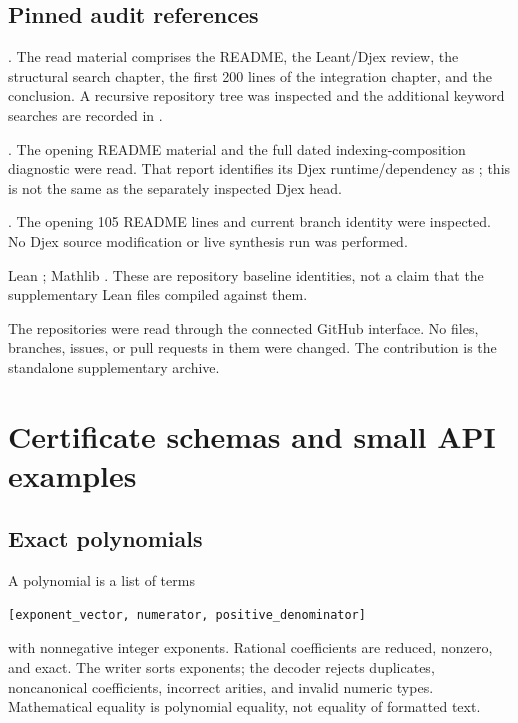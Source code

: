 \subsection{Pinned audit references}
\begin{description}[style=nextline]
\item[Forge]
.
The read material comprises the README, the Leant/Djex review, the structural
search chapter, the first 200 lines of the integration chapter, and the
conclusion. A recursive repository tree was inspected and the additional
keyword searches are recorded in .
\item[Leant]
.
The opening README material and the full dated indexing-composition diagnostic
were read. That report identifies its Djex runtime/dependency as
; this is not the same as the separately inspected Djex head.
\item[Djex]
.
The opening 105 README lines and current branch identity were inspected. No
Djex source modification or live synthesis run was performed.
\item[Forge's reported target toolchain]
Lean ; Mathlib
.
These are repository baseline identities, not a claim that the supplementary
Lean files compiled against them.
\end{description}

The repositories were read through the connected GitHub interface. No files,
branches, issues, or pull requests in them were changed. The contribution is the
standalone supplementary archive.

\section{Certificate schemas and small API examples}
\label{app:schemas}

\subsection{Exact polynomials}
A polynomial is a list of terms
\begin{lstlisting}
[exponent_vector, numerator, positive_denominator]
\end{lstlisting}
with nonnegative integer exponents. Rational coefficients are reduced, nonzero,
and exact. The writer sorts exponents; the decoder rejects duplicates,
noncanonical coefficients, incorrect arities, and invalid numeric types.
Mathematical equality is polynomial equality, not equality of formatted text.

